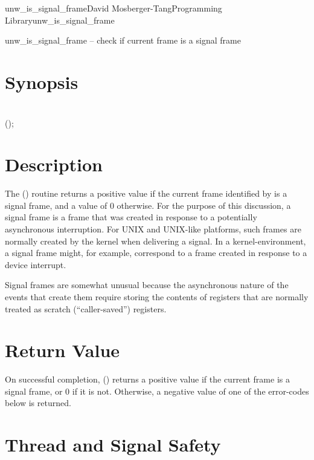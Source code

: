 \documentclass{article}
\begin{document}
\begin{Name}{3}{unw\_is\_signal\_frame}{David Mosberger-Tang}{Programming Library}{unw\_is\_signal\_frame}

  unw\_is\_signal\_frame -- check if current frame is a signal frame
\end{Name}

\section{Synopsis}

\\

 ();\\

\section{Description}

The () routine returns a positive value
if the current frame identified by  is a signal frame, and a
value of 0 otherwise.  For the purpose of this discussion, a signal
frame is a frame that was created in response to a potentially
asynchronous interruption.  For UNIX and UNIX-like platforms, such
frames are normally created by the kernel when delivering a signal.
In a kernel-environment, a signal frame might, for example, correspond
to a frame created in response to a device interrupt.

Signal frames are somewhat unusual because the asynchronous nature of
the events that create them require storing the contents of registers
that are normally treated as scratch (``caller-saved'') registers.

\section{Return Value}

On successful completion, () returns a
positive value if the current frame is a signal frame, or 0 if it is
not.  Otherwise, a negative value of one of the error-codes below is
returned.

\section{Thread and Signal Safety}
\end{document}
